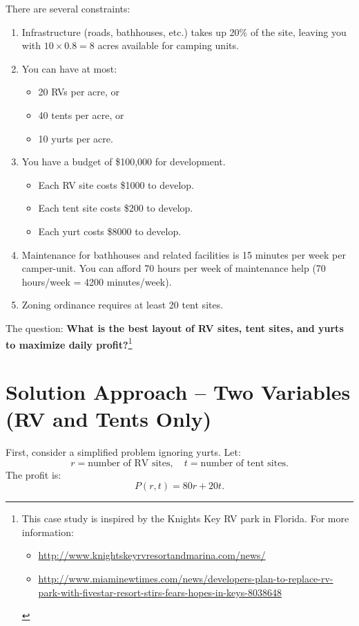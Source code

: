 There are several constraints:
\begin{enumerate}
    \item Infrastructure (roads, bathhouses, etc.) takes up 20\% of the site, leaving you with $10 \times 0.8 = 8$ acres available for camping units.
    \item You can have at most:
    \begin{itemize}
        \item 20 RVs per acre, or
        \item 40 tents per acre, or
        \item 10 yurts per acre.
    \end{itemize}
    \item You have a budget of \$100,000 for development.
    \begin{itemize}
        \item Each RV site costs \$1000 to develop.
        \item Each tent site costs \$200 to develop.
        \item Each yurt costs \$8000 to develop.
    \end{itemize}
    \item Maintenance for bathhouses and related facilities is 15 minutes per week per camper-unit. You can afford 70 hours per week of maintenance help (70 hours/week = 4200 minutes/week).
    \item Zoning ordinance requires at least 20 tent sites.
\end{enumerate}

The question: \textbf{What is the best layout of RV sites, tent sites, and yurts to maximize daily profit?}\footnote{
This case study is inspired by the Knights Key RV park in Florida. For more information:
\begin{itemize}
    \item \url{http://www.knightskeyrvresortandmarina.com/news/}
    \item \url{http://www.miaminewtimes.com/news/developers-plan-to-replace-rv-park-with-fivestar-resort-stirs-fears-hopes-in-keys-8038648}
\end{itemize}}

\section{Solution Approach -- Two Variables (RV and Tents Only)}
First, consider a simplified problem ignoring yurts. Let:
\[
r = \text{number of RV sites}, \quad t = \text{number of tent sites}.
\]
The profit is:
\[
P(r,t) = 80r + 20t.
\]

